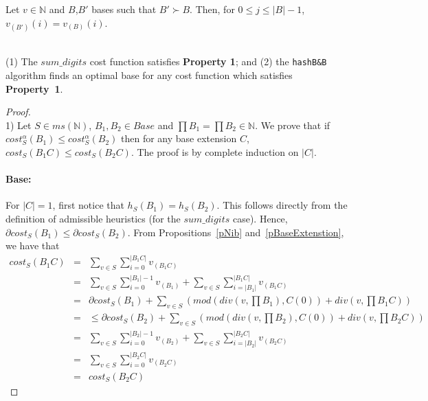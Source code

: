 \documentclass[envcountsame]{llncs}
\newcommand{\Base}{\mathit{Base}}
\newcommand{\intMultiSet}{\mathit{ms(\mathbb{N})}}
\newcommand{\sumDigits}{\mathit{sum\_digits}}
\newcommand{\cost}{\mathit{cost}}
\begin{document}
\begin{proposition}
\label{pBaseExtenstion}
Let $v\in \mathbb{N}$ and $B$,$B'$ bases such that $B'\succ B$.
Then, for $0 \leq j \leq |B|-1$, $v_{(B')}(i) = v_{(B)}(i)$.
\end{proposition}


\noindent{}\\
\noindent(1) The $\sumDigits$ cost function satisfies \textbf{Property 1}; and
(2)
the \texttt{hashB\&B} algorithm finds an optimal base for any cost
function which satisfies \textbf{Property~1}.



\begin{proof}~\\
  1) Let $S\in\intMultiSet$, $B_1,B_2 \in \Base$ and $\prod B_1= \prod
  B_2 \in \mathbb{N}$. We prove that if $\cost_S^\alpha(B_1) \leq
  \cost_S^\alpha(B_2)$ then for any base extension $C$, $\cost_S(B_1
  C) \leq \cost_S(B_2 C)$.  The proof is by complete induction on
  $|C|$.

\paragraph{\bf Base:} 

For $|C|=1$, first notice that $h_S(B_1)=h_S(B_2)$. This follows
directly from the definition of admissible heuristics (for the
$\sumDigits$ case). Hence, $\partial \cost_S(B_1) \leq \partial
\cost_S(B_2)$.
From Propositions~\ref{pNib} and~\ref{pBaseExtenstion}, we have that
{\small
\begin{eqnarray*}
  cost_S(B_1 C) &=& \sum_{v \in S} \sum_{i=0}^{|B_1 C|} v_{(B_1 C)}\\
                &=& \sum_{v \in S}\sum_{i=0}^{|B_1|-1}v_{(B_1)} + \sum_{v \in
                     S}\sum_{i=|B_1|}^{|B_1 C|}v_{(B_1 C)}\\
                &=&  \partial \cost_S(B_1) + \sum_{v \in S}  
                      (mod(div(v,\prod B_1),C(0)) + div(v,\prod B_1
                      C))\\
                &=&  \leq \partial \cost_S(B_2)+ \sum_{v \in S} 
                      (mod(div(v,\prod B_2),C(0)) + div(v,\prod B_2
                      C))\\
                &=&  \sum_{v \in S}\sum_{i=0}^{|B_2|-1}v_{(B_2)} + \sum_{v \in
                      S}\sum_{i=|B_2|}^{|B_2 C|}v_{(B_2 C)}\\
                &=&  \sum_{v \in S} \sum_{i=0}^{|B_2 C|} v_{(B_2 C)}\\
                &=&  \cost_S(B_2 C)
\end{eqnarray*}}


\end{proof}
\end{document}
